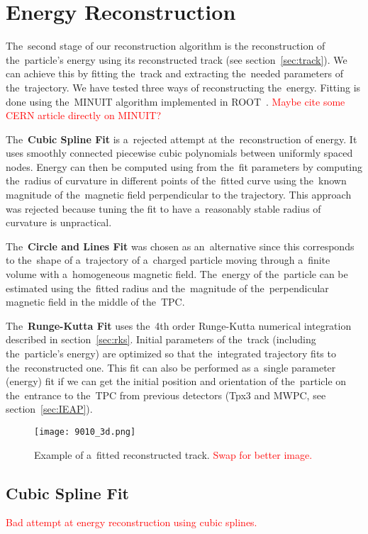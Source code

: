\chapter{Energy Reconstruction}
\label{sec:energy}
	The~second stage of our reconstruction algorithm is the reconstruction of the~particle's energy using its reconstructed track (see section~\ref{sec:track}). We can achieve this by fitting the~track and extracting the~needed parameters of the~trajectory. We have tested three ways of reconstructing the~energy. Fitting is done using the~MINUIT algorithm implemented in ROOT~\cite{ROOT}. \textcolor{red}{Maybe cite some CERN article directly on MINUIT?}
	
	The~\textbf{Cubic Spline Fit} is a~rejected attempt at the~reconstruction of energy. It uses smoothly connected piecewise cubic polynomials between uniformly spaced nodes. Energy can then be computed using from the~fit parameters by computing the~radius of curvature in different points of the~fitted curve using the~known magnitude of the~magnetic field perpendicular to the trajectory. This approach was rejected because tuning the fit to have a~reasonably stable radius of curvature is unpractical.
	
	The~\textbf{Circle and Lines Fit} was chosen as an~alternative since this corresponds to the~shape of a~trajectory of a~charged particle moving through a~finite volume with a~homogeneous magnetic field. The~energy of the~particle can be estimated using the~fitted radius and the~magnitude of the~perpendicular magnetic field in the middle of the~TPC.
	
	The~\textbf{Runge-Kutta Fit} uses the~4th order Runge-Kutta numerical integration described in section~\ref{sec:rks}. Initial parameters of the~track (including the~particle's energy) are optimized so that the~integrated trajectory fits to the~reconstructed one. This fit can also be performed as a~single parameter (energy) fit if we can get the initial position and orientation of the~particle on the~entrance to the~TPC from previous detectors (Tpx3 and MWPC, see section~\ref{sec:IEAP}).
	
	\begin{figure}
		\centering
		\texttt{[image: 9010\_3d.png]}
		\caption{Example of a~fitted reconstructed track. \textcolor{red}{Swap for better image.}}
		\label{fig:90103d}
	\end{figure}
	
	\section{Cubic Spline Fit}
		\textcolor{red}{Bad attempt at energy reconstruction using cubic splines.}
		
